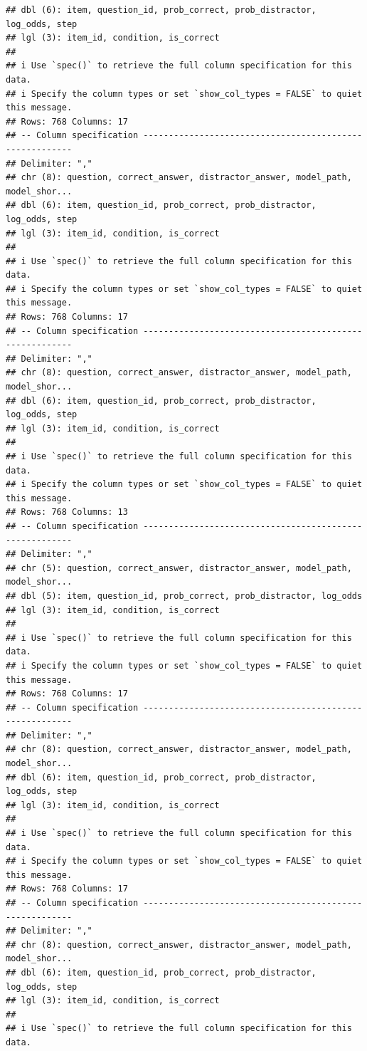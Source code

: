\documentclass[
]{article}
\begin{document}
\begin{verbatim}
## dbl (6): item, question_id, prob_correct, prob_distractor, log_odds, step
## lgl (3): item_id, condition, is_correct
## 
## i Use `spec()` to retrieve the full column specification for this data.
## i Specify the column types or set `show_col_types = FALSE` to quiet this message.
## Rows: 768 Columns: 17
## -- Column specification --------------------------------------------------------
## Delimiter: ","
## chr (8): question, correct_answer, distractor_answer, model_path, model_shor...
## dbl (6): item, question_id, prob_correct, prob_distractor, log_odds, step
## lgl (3): item_id, condition, is_correct
## 
## i Use `spec()` to retrieve the full column specification for this data.
## i Specify the column types or set `show_col_types = FALSE` to quiet this message.
## Rows: 768 Columns: 17
## -- Column specification --------------------------------------------------------
## Delimiter: ","
## chr (8): question, correct_answer, distractor_answer, model_path, model_shor...
## dbl (6): item, question_id, prob_correct, prob_distractor, log_odds, step
## lgl (3): item_id, condition, is_correct
## 
## i Use `spec()` to retrieve the full column specification for this data.
## i Specify the column types or set `show_col_types = FALSE` to quiet this message.
## Rows: 768 Columns: 13
## -- Column specification --------------------------------------------------------
## Delimiter: ","
## chr (5): question, correct_answer, distractor_answer, model_path, model_shor...
## dbl (5): item, question_id, prob_correct, prob_distractor, log_odds
## lgl (3): item_id, condition, is_correct
## 
## i Use `spec()` to retrieve the full column specification for this data.
## i Specify the column types or set `show_col_types = FALSE` to quiet this message.
## Rows: 768 Columns: 17
## -- Column specification --------------------------------------------------------
## Delimiter: ","
## chr (8): question, correct_answer, distractor_answer, model_path, model_shor...
## dbl (6): item, question_id, prob_correct, prob_distractor, log_odds, step
## lgl (3): item_id, condition, is_correct
## 
## i Use `spec()` to retrieve the full column specification for this data.
## i Specify the column types or set `show_col_types = FALSE` to quiet this message.
## Rows: 768 Columns: 17
## -- Column specification --------------------------------------------------------
## Delimiter: ","
## chr (8): question, correct_answer, distractor_answer, model_path, model_shor...
## dbl (6): item, question_id, prob_correct, prob_distractor, log_odds, step
## lgl (3): item_id, condition, is_correct
## 
## i Use `spec()` to retrieve the full column specification for this data.

\end{verbatim}
\end{document}
